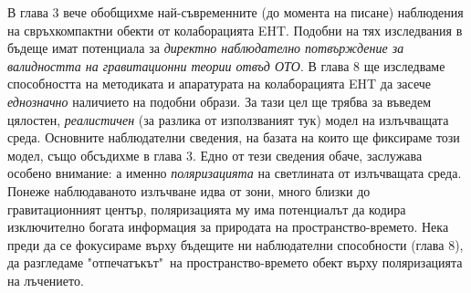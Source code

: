 В глава 3 вече обобщихме най-съвременните (до момента на писане) наблюдения на свръхкомпактни обекти от колаборацията EHT. Подобни на тях изследвания в бъдеще имат потенциала за \emph{директно наблюдателно потвърждение за валидността на гравитационни теории отвъд ОТО}. В глава 8 ще изследваме способността на методиката и апаратурата на колаборацията EHT да засече \emph{еднозначно} наличието на подобни образи. За тази цел ще трябва за въведем цялостен, \emph{реалистичен} (за разлика от използваният тук) модел на излъчващата среда. Основните наблюдателни сведения, на базата на които ще фиксираме този модел, също обсъдихме в глава 3. Едно от тези сведения обаче, заслужава особено внимание: а именно \emph{поляризацията} на светлината от излъчващата среда. Понеже наблюдаваното излъчване идва от зони, много близки до гравитационният център, поляризацията му има потенциалът да кодира изключително богата информация за природата на пространство-времето. Нека преди да се фокусираме върху бъдещите ни наблюдателни способности (глава 8), да разгледаме "отпечатъкът"$\,$ на пространство-времето обект върху поляризацията на лъчението. 
